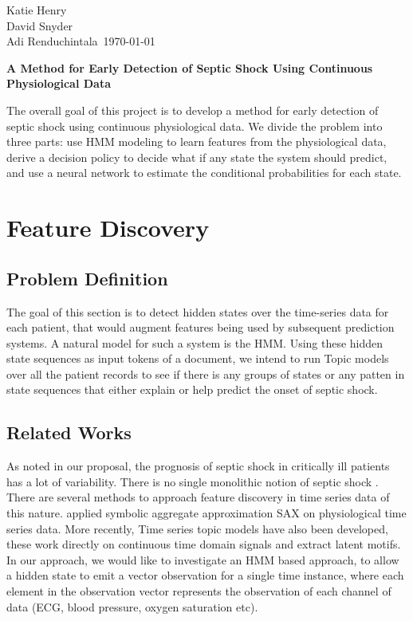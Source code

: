 \documentclass[12pt,solutions]{article}
\newcommand{\prof}{Katie Henry \\ David Snyder \\ Adi Renduchintala}
\newcommand{\topic}{MLCD Project}
\newlength{\toppush}
\newcommand{\htitle} 
{
    \noindent\vspace*{-\toppush}\newline\parbox{6.5in}
    {
        \vspace{-.85cm}
        \prof\hfill \ 
	 \today
	\vspace*{-.5ex}\newline
        \mbox{}\hrulefill\mbox{}
    }
    \vspace*{1ex}\mbox{}\newline
    \begin{center}{
        \large\bf{A Method for Early Detection of Septic Shock Using Continuous Physiological Data
} }\end{center}
}
\newcommand{\handout}
{
    \thispagestyle{empty}
    \markboth{\topic}{\topic}
    \pagestyle{myheadings}
    \htitle
}
\begin{document}
\handout

\setlength{\parindent}{0pt}

The overall goal of this project is to develop a method for early detection of septic shock using continuous physiological data. We divide the problem into three parts: use HMM modeling to learn features from the physiological data, derive a decision policy to decide what if any state the system should predict, and use a neural network to estimate the conditional probabilities for each state.

\setcounter{section}{0}
\section{Feature Discovery}
\subsection{Problem Definition}
The goal of this section is to detect hidden states over the time-series data for each patient, that would augment features being used by subsequent prediction systems. A natural model for such a system is the HMM. Using these hidden state sequences as input tokens of a document, we intend to run Topic models over all the patient records to see if there is any groups of states or any patten in state sequences that either explain or help predict the onset of septic shock.
\subsection{Related Works}
As noted in our proposal, the prognosis of septic shock in critically ill patients has a lot of variability. There is no single monolithic notion of septic shock \cite{Shavdia2007} . There are several methods to approach feature discovery in time series data of this nature. \cite{Esbroeck2012hrt}  applied symbolic aggregate approximation SAX \cite{Lin2003sax} on physiological time series data. More recently, Time series topic models have also been developed, \cite{SariaThesis2011} these work directly on continuous time domain signals and extract latent motifs. In our approach, we would like to investigate an HMM based approach, to allow a hidden state to emit a vector observation for a single time instance, where each element in the observation vector represents the observation of each channel of data (ECG, blood pressure, oxygen saturation etc).
\end{document}
